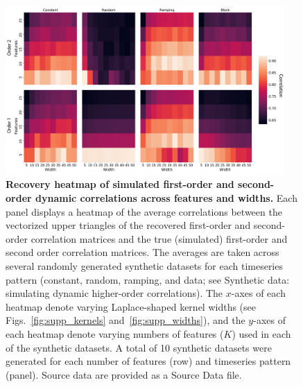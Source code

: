 \documentclass[english]{article}
\begin{document}
\begin{figure}[p!]
\centering
\includegraphics[width=0.95\textwidth]{figs/sim_heatmaps_features}
  \caption{\textbf{Recovery heatmap of simulated first-order and
      second-order dynamic correlations across features and widths.}  Each panel displays a
    heatmap of the average correlations
    between the vectorized upper triangles of the recovered
    first-order and second-order correlation matrices and the true
    (simulated) first-order and second order correlation matrices.
    The averages are taken across several randomly generated
    synthetic datasets for each timeseries pattern (constant, random,
    ramping, and data; see Synthetic data: simulating dynamic higher-order
      correlations).  The $x$-axes of each heatmap denote varying
    Laplace-shaped kernel widths (see Figs.~\ref{fig:supp_kernels}
    and~\ref{fig:supp_widths}), and the $y$-axes of each heatmap
    denote varying numbers of features ($K$) used in each of the synthetic datasets.
    A total of 10 synthetic datasets were generated for each number of features
    (row) and timeseries pattern (panel). Source data are provided as a Source Data file.}
\label{fig:features}
\end{figure}
\end{document}

